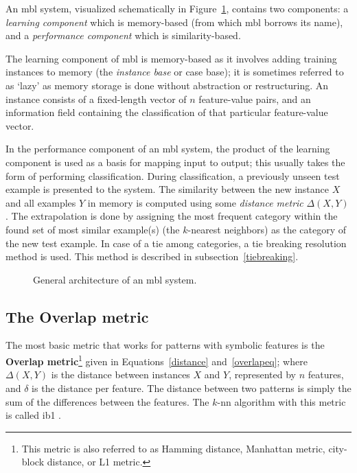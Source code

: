 \documentclass{book}
\begin{document}
An {\sc mbl} system, visualized schematically in
Figure~\ref{mbl-method}, contains two components: a {\em learning
component}\/ which is memory-based (from which {\sc mbl} borrows its
name), and a {\em performance component}\/ which is similarity-based.

The learning component of {\sc mbl} is memory-based as it involves
adding training instances to memory (the {\em instance base} or case
base); it is sometimes referred to as `lazy' as memory storage is done
without abstraction or restructuring.  An instance consists of a
fixed-length vector of $n$ feature-value pairs, and an information
field containing the classification of that particular feature-value
vector.

In the performance component of an {\sc mbl} system, the product of
the learning component is used as a basis for mapping input to output;
this usually takes the form of performing classification.  During
classification, a previously unseen test example is presented to the
system. The similarity between the new instance $X$ and all examples
$Y$ in memory is computed using some {\em distance metric}
$\Delta(X,Y)$. The extrapolation is done by assigning the most
frequent category within the found set of most similar example(s) (the
$k$-nearest neighbors) as the category of the new test example. In
case of a tie among categories, a tie breaking resolution method is
used. This method is described in subsection~\ref{tiebreaking}.

\begin{figure}[htb]
        \begin{center}
                \leavevmode
                \epsfxsize=8cm
                \caption{General architecture of an {\sc mbl} system.
                }
                \label{mbl-method}
        \end{center}
\end{figure}

\subsection{The Overlap metric}
\label{overlap}

The most basic metric that works for patterns with symbolic features
is the {\bf Overlap metric}\footnote{This metric is also referred to
as Hamming distance, Manhattan metric, city-block distance, or L1
metric.} given in Equations~\ref{distance} and~\ref{overlapeq}; where
$\Delta(X,Y)$ is the distance between instances $X$ and $Y$,
represented by $n$ features, and $\delta$ is the distance per
feature. The distance between two patterns is simply the sum of the
differences between the features. The $k$-{\sc nn} algorithm with this
metric is called {\sc ib1} \cite{Aha+91}.
\end{document}
